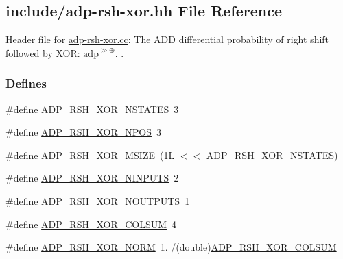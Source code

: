 \hypertarget{adp-rsh-xor_8hh}{\subsection{include/adp-\/rsh-\/xor.hh \-File \-Reference}
\label{adp-rsh-xor_8hh}
}


\-Header file for \hyperlink{adp-rsh-xor_8cc}{adp-\/rsh-\/xor.\-cc}\-: \-The \-A\-D\-D differential probability of right shift followed by \-X\-O\-R\-: $\mathrm{adp}^{\gg\oplus}$. .  


\subsubsection*{\-Defines}
\begin{DoxyCompactItemize}
\item 
\#define \hyperlink{adp-rsh-xor_8hh_a38c9a94be7a0b0d38c878829f469b5c5}{\-A\-D\-P\-\_\-\-R\-S\-H\-\_\-\-X\-O\-R\-\_\-\-N\-S\-T\-A\-T\-E\-S}~3
\item 
\#define \hyperlink{adp-rsh-xor_8hh_abe191c1637b1cdb4211dbcff645346ae}{\-A\-D\-P\-\_\-\-R\-S\-H\-\_\-\-X\-O\-R\-\_\-\-N\-P\-O\-S}~3
\item 
\#define \hyperlink{adp-rsh-xor_8hh_a7c15a8e63b05733ab27a1c20c0011238}{\-A\-D\-P\-\_\-\-R\-S\-H\-\_\-\-X\-O\-R\-\_\-\-M\-S\-I\-Z\-E}~(1\-L $<$$<$ A\-D\-P\-\_\-\-R\-S\-H\-\_\-\-X\-O\-R\-\_\-\-N\-S\-T\-A\-T\-E\-S)
\item 
\#define \hyperlink{adp-rsh-xor_8hh_af06b0ef8a3a7743300be5e39eeaf01f8}{\-A\-D\-P\-\_\-\-R\-S\-H\-\_\-\-X\-O\-R\-\_\-\-N\-I\-N\-P\-U\-T\-S}~2
\item 
\#define \hyperlink{adp-rsh-xor_8hh_a4fd512dc2f2cac554bcf399755ae55f1}{\-A\-D\-P\-\_\-\-R\-S\-H\-\_\-\-X\-O\-R\-\_\-\-N\-O\-U\-T\-P\-U\-T\-S}~1
\item 
\#define \hyperlink{adp-rsh-xor_8hh_a9399cb0e1840f182084407e598d6acd1}{\-A\-D\-P\-\_\-\-R\-S\-H\-\_\-\-X\-O\-R\-\_\-\-C\-O\-L\-S\-U\-M}~4
\item 
\#define \hyperlink{adp-rsh-xor_8hh_a7866f27403853ea49544d13b4d6f7f7e}{\-A\-D\-P\-\_\-\-R\-S\-H\-\_\-\-X\-O\-R\-\_\-\-N\-O\-R\-M}~1. /(double)\hyperlink{adp-rsh-xor_8hh_a9399cb0e1840f182084407e598d6acd1}{\-A\-D\-P\-\_\-\-R\-S\-H\-\_\-\-X\-O\-R\-\_\-\-C\-O\-L\-S\-U\-M}
\end{DoxyCompactItemize}
